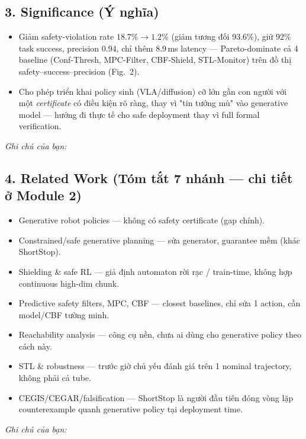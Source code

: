 \documentclass[a4paper,12pt]{article}
\begin{document}
\subsection*{3. Significance (Ý nghĩa)}
\begin{itemize}
  \item Giảm safety-violation rate $18.7\%\to1.2\%$ (giảm tương đối 93.6\%), giữ 92\% task success, precision 0.94, chỉ thêm 8.9\,ms latency — Pareto-dominate cả 4 baseline (Conf-Thresh, MPC-Filter, CBF-Shield, STL-Monitor) trên đồ thị safety--success--precision (Fig.~2).
  \item Cho phép triển khai policy sinh (VLA/diffusion) cỡ lớn gần con người với một \emph{certificate} có điều kiện rõ ràng, thay vì "tin tưởng mù" vào generative model — hướng đi thực tế cho safe deployment thay vì full formal verification.
\end{itemize}
\begin{tasklist}
  \item[\square] \textit{Ghi chú của bạn:} \underline{\hspace{10cm}}
\end{tasklist}

\subsection*{4. Related Work (Tóm tắt 7 nhánh — chi tiết ở Module 2)}
\begin{itemize}
  \item[A.] Generative robot policies — không có safety certificate (gap chính).
  \item[B.] Constrained/safe generative planning — sửa generator, guarantee mềm (khác ShortStop).
  \item[C.] Shielding \& safe RL — giả định automaton rời rạc / train-time, không hợp continuous high-dim chunk.
  \item[D.] Predictive safety filters, MPC, CBF — closest baselines, chỉ sửa 1 action, cần model/CBF tường minh.
  \item[E.] Reachability analysis — công cụ nền, chưa ai dùng cho generative policy theo cách này.
  \item[F.] STL \& robustness — trước giờ chủ yếu đánh giá trên 1 nominal trajectory, không phải cả tube.
  \item[G.] CEGIS/CEGAR/falsification — ShortStop là người đầu tiên đóng vòng lặp counterexample quanh generative policy tại deployment time.
\end{itemize}
\begin{tasklist}
  \item[\square] \textit{Ghi chú của bạn:} \underline{\hspace{10cm}}
\end{tasklist}
\end{document}
